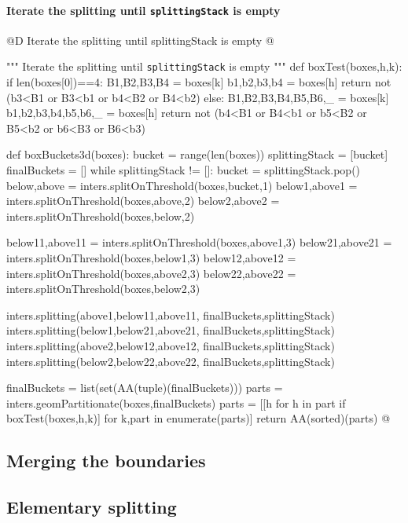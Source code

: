 \documentclass[11pt,oneside]{article}    %
\begin{document}
\paragraph{Iterate the splitting until \texttt{splittingStack} is empty}
@D Iterate the splitting until splittingStack is empty
@{""" Iterate the splitting until \texttt{splittingStack} is empty """
def boxTest(boxes,h,k):
    if len(boxes[0])==4:
        B1,B2,B3,B4 = boxes[k]
        b1,b2,b3,b4 = boxes[h]
        return not (b3<B1 or B3<b1 or b4<B2 or B4<b2)
    else:
        B1,B2,B3,B4,B5,B6,_ = boxes[k]
        b1,b2,b3,b4,b5,b6,_ = boxes[h]
        return not (b4<B1 or B4<b1 or b5<B2 or B5<b2 or b6<B3 or B6<b3)
        
def boxBuckets3d(boxes):
    bucket = range(len(boxes))
    splittingStack = [bucket]
    finalBuckets = []
    while splittingStack != []:
        bucket = splittingStack.pop()
        below,above = inters.splitOnThreshold(boxes,bucket,1)
        below1,above1 = inters.splitOnThreshold(boxes,above,2)
        below2,above2 = inters.splitOnThreshold(boxes,below,2) 
               
        below11,above11 = inters.splitOnThreshold(boxes,above1,3)
        below21,above21 = inters.splitOnThreshold(boxes,below1,3)        
        below12,above12 = inters.splitOnThreshold(boxes,above2,3)
        below22,above22 = inters.splitOnThreshold(boxes,below2,3)  
              
        inters.splitting(above1,below11,above11, finalBuckets,splittingStack)
        inters.splitting(below1,below21,above21, finalBuckets,splittingStack)
        inters.splitting(above2,below12,above12, finalBuckets,splittingStack)
        inters.splitting(below2,below22,above22, finalBuckets,splittingStack)
        
        finalBuckets = list(set(AA(tuple)(finalBuckets)))
    parts = inters.geomPartitionate(boxes,finalBuckets)
    parts = [[h for h in part if boxTest(boxes,h,k)] for k,part in enumerate(parts)]
    return AA(sorted)(parts)
@}


\subsection{Merging the boundaries}

\subsection{Elementary splitting}
\end{document}
